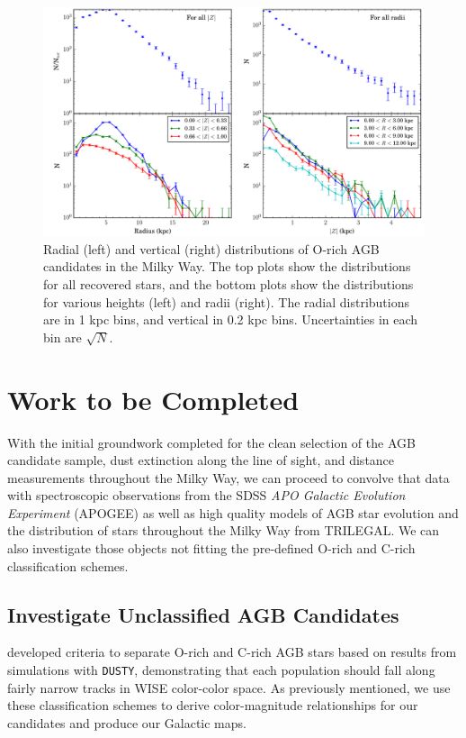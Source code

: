 \begin{figure}[h]
\centering
\includegraphics[width=6.5in]{figs/orich_radial_vertical_profile.pdf}
\caption{Radial (left) and vertical (right) distributions of O-rich AGB candidates in the Milky Way. The top plots show the distributions for all recovered stars, and the bottom plots show the distributions for various heights (left) and radii (right). The radial distributions are in 1 kpc bins, and vertical in 0.2 kpc bins. Uncertainties in each bin are $\sqrt{N}$.}
\label{fig:horvert_profile}
\end{figure}

\section{Work to be Completed}
With the initial groundwork completed for the clean selection of the AGB candidate sample, dust extinction along the line of sight, and distance measurements throughout the Milky Way, we can proceed to convolve that data with spectroscopic observations from the SDSS \emph{APO Galactic Evolution Experiment} (APOGEE) as well as high quality models of AGB star evolution and the distribution of stars throughout the Milky Way from TRILEGAL. We can also investigate those objects not fitting the pre-defined O-rich and C-rich classification schemes.
\subsection{Investigate Unclassified AGB Candidates}
 \cite{2014MNRAS.442.3361N} developed criteria to separate O-rich and C-rich AGB stars based on results from simulations with {\tt DUSTY}, demonstrating that each population should fall along fairly narrow tracks in WISE color-color space. As previously mentioned, we use these classification schemes to derive color-magnitude relationships for our candidates and produce our Galactic maps. 
 
